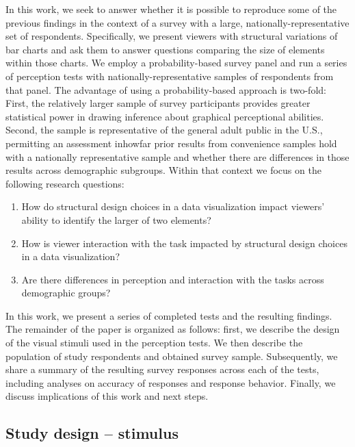 \documentclass[
]{jds}
\begin{document}
In this work, we seek to answer whether it is possible to reproduce some
of the previous findings in the context of a survey with a large,
nationally-representative set of respondents. Specifically, we present
viewers with structural variations of bar charts and ask them to answer
questions comparing the size of elements within those charts. We employ
a probability-based survey panel and run a series of perception tests
with nationally-representative samples of respondents from that panel.
The advantage of using a probability-based approach is two-fold: First,
the relatively larger sample of survey participants provides greater
statistical power in drawing inference about graphical perceptional
abilities. Second, the sample is representative of the general adult
public in the U.S., permitting an assessment inhowfar prior results from
convenience samples hold with a nationally representative sample and
whether there are differences in those results across demographic
subgroups. Within that context we focus on the following research
questions:

\begin{enumerate}
\def\labelenumi{\arabic{enumi}.}
\item
  How do structural design choices in a data visualization impact
  viewers' ability to identify the larger of two elements?
\item
  How is viewer interaction with the task impacted by structural design
  choices in a data visualization?
\item
  Are there differences in perception and interaction with the tasks
  across demographic groups?
\end{enumerate}

In this work, we present a series of completed tests and the resulting
findings. The remainder of the paper is organized as follows: first, we
describe the design of the visual stimuli used in the perception tests.
We then describe the population of study respondents and obtained survey
sample. Subsequently, we share a summary of the resulting survey
responses across each of the tests, including analyses on accuracy of
responses and response behavior. Finally, we discuss implications of
this work and next steps.

\hypertarget{study-design-stimulus}{%
\subsection{Study design -- stimulus}\label{study-design-stimulus}}
\end{document}
